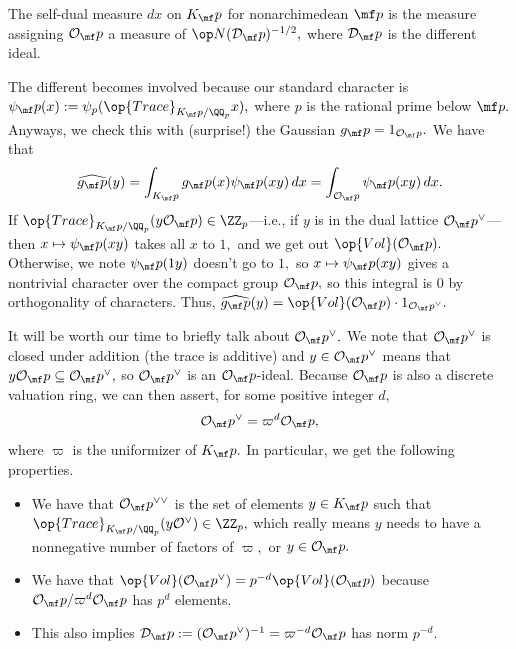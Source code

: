 \begin{lemma}
    The self-dual measure $dx$ on $K_\mf p$ for nonarchimedean $\mf p$ is the measure assigning $\mathcal O_\mf p$ a measure of $\op N(\mathcal D_\mf p)^{-1/2},$ where $\mathcal D_\mf p$ is the different ideal.
\end{lemma}
The different becomes involved because our standard character is $\psi_\mf p(x):=\psi_p(\op{Trace}_{K_\mf p/\QQ_p}x),$ where $p$ is the rational prime below $\mf p.$ Anyways, we check this with (surprise!) the Gaussian $g_\mf p=1_{\mathcal O_\mf p}.$ We have that
\[\widehat{g_\mf p}(y)=\int_{K_\mf p}g_\mf p(x)\psi_\mf p(xy)\,dx=\int_{\mathcal O_\mf p}\psi_\mf p(xy)\,dx.\]
If $\op{Trace}_{K_\mf p/\QQ_p}(y\mathcal O_\mf p)\in\ZZ_p$---i.e., if $y$ is in the dual lattice $\mathcal O_\mf p^\vee$---then $x\mapsto\psi_\mf p(xy)$ takes all $x$ to $1,$ and we get out $\op{Vol}(\mathcal O_\mf p).$ Otherwise, we note $\psi_\mf p(1y)$ doesn't go to $1,$ so $x\mapsto\psi_\mf p(xy)$ gives a nontrivial character over the compact group $\mathcal O_\mf p,$ so this integral is $0$ by orthogonality of characters. Thus, $\widehat{g_\mf p}(y)=\op{Vol}(\mathcal O_\mf p)\cdot1_{\mathcal O_\mf p^\vee}.$

It will be worth our time to briefly talk about $\mathcal O_\mf p^\vee.$ We note that $\mathcal O_\mf p^\vee$ is closed under addition (the trace is additive) and $y\in\mathcal O_\mf p^\vee$ means that $y\mathcal O_\mf p\subseteq\mathcal O_\mf p^\vee,$ so $\mathcal O_\mf p^\vee$ is an $\mathcal O_\mf p$-ideal. Because $\mathcal O_\mf p$ is also a discrete valuation ring, we can then assert, for some positive integer $d,$
\[\mathcal O_\mf p^\vee=\varpi^d\mathcal O_\mf p,\]
where $\varpi$ is the uniformizer of $K_\mf p.$ In particular, we get the following properties.
\begin{itemize}
    \item We have that $\mathcal O_\mf p^{\vee\vee}$ is the set of elements $y\in K_\mf p$ such that $\op{Trace}_{K_\mf p/\QQ_p}(y\mathcal O^\vee)\in\ZZ_p,$ which really means $y$ needs to have a nonnegative number of factors of $\varpi,$ or $y\in\mathcal O_\mf p.$
    \item We have that $\op{Vol}(\mathcal O_\mf p^\vee)=p^{-d}\op{Vol}(\mathcal O_\mf p)$ because $\mathcal O_\mf p/\varpi^d\mathcal O_\mf p$ has $p^d$ elements.
    \item This also implies $\mathcal D_\mf p:=(\mathcal O_\mf p^\vee)^{-1}=\varpi^{-d}\mathcal O_\mf p$ has norm $p^{-d}.$
\end{itemize}

